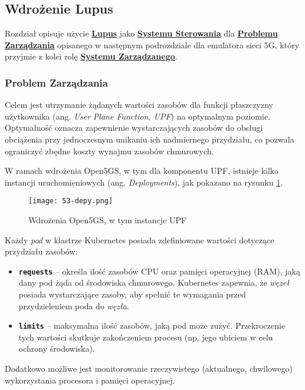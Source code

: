 \subsection{Wdrożenie Lupus}

Rozdział opisuje użycie \hyperlink{def:lupus}{\textbf{Lupus}} jako \hyperlink{def:system-sterowania}{\textbf{Systemu Sterowania}} dla \hyperlink{def:problem-zarzadzania}{\textbf{Problemu Zarządzania}} opisanego w następnym podrozdziale dla emulatora sieci 5G, który przyjmie z kolei rolę \hyperlink{def:system-zarzadzany}{\textbf{Systemu Zarządzanego}}. 

\subsubsection{Problem Zarządzania}

Celem jest utrzymanie żądanych wartości zasobów dla funkcji płaszczyzny użytkownika (ang. \textit{User Plane Function, UPF}) na optymalnym poziomie. Optymalność oznacza zapewnienie wystarczających zasobów do obsługi obciążenia przy jednoczesnym unikaniu ich nadmiernego przydziału, co pozwala ograniczyć zbędne koszty wynajmu zasobów chmurowych.

W ramach wdrożenia Open5GS, w tym dla komponentu UPF, istnieje kilka instancji uruchomieniowych (ang. \textit{Deployments}), jak pokazano na rysunku \ref{fig:53-depy}.

\begin{figure}[!h]
    \centering \texttt{[image: 53-depy.png]}
    \caption{Wdrożenia Open5GS, w tym instancje UPF}\label{fig:53-depy}
\end{figure}

Każdy \textit{pod} w klastrze Kubernetes posiada zdefiniowane wartości dotyczące przydziału zasobów:

\begin{itemize}
    \item \textbf{\texttt{requests}} – określa ilość zasobów CPU oraz pamięci operacyjnej (RAM), jaką dany pod żąda od środowiska chmurowego. Kubernetes zapewnia, że \textit{węzeł} posiada wystarczające zasoby, aby spełnić te wymagania przed przydzieleniem poda do \textit{węzła}.
    \item \textbf{\texttt{limits}} – maksymalna ilość zasobów, jaką pod może zużyć. Przekroczenie tych wartości skutkuje zakończeniem procesu (np. jego ubiciem w celu ochrony środowiska).
\end{itemize}

Dodatkowo możliwe jest monitorowanie rzeczywistego (aktualnego, chwilowego) wykorzystania procesora i pamięci operacyjnej.


